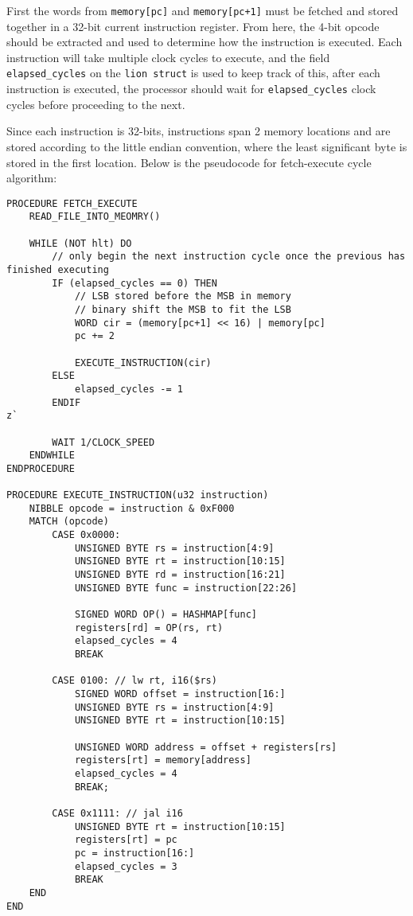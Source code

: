 First the words from \texttt{memory[pc]} and \texttt{memory[pc+1]} must be fetched and stored together in a 32-bit current instruction register. From here, the 4-bit opcode should be extracted and used to determine how the instruction is executed. Each instruction will take multiple clock cycles to execute, and the field \texttt{elapsed\_cycles} on the \texttt{lion struct} is used to keep track of this, after each instruction is executed, the processor should wait for \texttt{elapsed\_cycles} clock cycles before proceeding to the next. 

Since each instruction is 32-bits, instructions span 2 memory locations and are stored according to the little endian convention, where the least significant byte is stored in the first location. Below is the pseudocode for fetch-execute cycle algorithm: 

\begin{lstlisting}
PROCEDURE FETCH_EXECUTE 
    READ_FILE_INTO_MEOMRY()

    WHILE (NOT hlt) DO 
        // only begin the next instruction cycle once the previous has finished executing
        IF (elapsed_cycles == 0) THEN 
            // LSB stored before the MSB in memory
            // binary shift the MSB to fit the LSB
            WORD cir = (memory[pc+1] << 16) | memory[pc]
            pc += 2

            EXECUTE_INSTRUCTION(cir)
        ELSE 
            elapsed_cycles -= 1
        ENDIF
z`

        WAIT 1/CLOCK_SPEED
    ENDWHILE
ENDPROCEDURE

PROCEDURE EXECUTE_INSTRUCTION(u32 instruction)
    NIBBLE opcode = instruction & 0xF000 
    MATCH (opcode) 
        CASE 0x0000: 
            UNSIGNED BYTE rs = instruction[4:9]
            UNSIGNED BYTE rt = instruction[10:15]
            UNSIGNED BYTE rd = instruction[16:21]
            UNSIGNED BYTE func = instruction[22:26]

            SIGNED WORD OP() = HASHMAP[func] 
            registers[rd] = OP(rs, rt)
            elapsed_cycles = 4
            BREAK

        CASE 0100: // lw rt, i16($rs)
            SIGNED WORD offset = instruction[16:]
            UNSIGNED BYTE rs = instruction[4:9]
            UNSIGNED BYTE rt = instruction[10:15]

            UNSIGNED WORD address = offset + registers[rs]
            registers[rt] = memory[address]
            elapsed_cycles = 4
            BREAK;

        CASE 0x1111: // jal i16
            UNSIGNED BYTE rt = instruction[10:15]
            registers[rt] = pc
            pc = instruction[16:]
            elapsed_cycles = 3
            BREAK
    END
END
\end{lstlisting}

